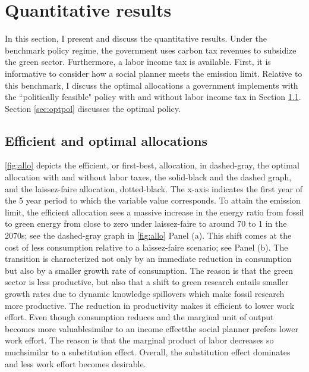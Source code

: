 \section{Quantitative results}\label{sec:res}

In this section, I present and discuss the quantitative results. Under the benchmark policy regime, the government uses carbon tax revenues to subsidize the green sector. Furthermore, a labor income tax is available. 
First, it is informative to consider how a social planner meets the emission limit. Relative to this benchmark, I discuss the optimal allocations a government implements with the ``politically feasible" policy with and without labor income tax in Section \ref{sec:allos}. Section \ref{sec:optpol} discusses the optimal policy.  %



\subsection{Efficient and optimal allocations}\label{sec:allos}

\autoref{fig:allo} depicts the efficient, or first-best, allocation, in dashed-gray, the optimal allocation with and without labor taxes, the solid-black and the dashed graph, and the laissez-faire allocation, dotted-black. The x-axis indicates the first year of the 5 year period to which the variable value corresponds. 
To attain the emission limit, the efficient allocation sees a massive increase in the energy ratio from fossil to green energy from close to zero under laissez-faire to around 70 to 1 in the 2070s; see the dashed-gray graph in \autoref{fig:allo} Panel (a). This shift comes at the cost of less consumption relative to a laissez-faire scenario; see Panel (b). The transition is characterized not only by an immediate reduction in consumption but also by a smaller growth rate of consumption. The reason is that the green sector is less productive, but also that a shift to green research entails smaller growth rates due to dynamic knowledge spillovers which make fossil research more productive. 
The reduction in productivity makes it efficient to lower work effort. Even though consumption reduces and the marginal unit of output becomes more valuable\textemdash similar to an income effect\textemdash the social planner prefers lower work effort. The reason is that the marginal product of labor decreases so much\textemdash similar to a substitution effect. Overall, the substitution effect dominates and less work effort becomes desirable. 

